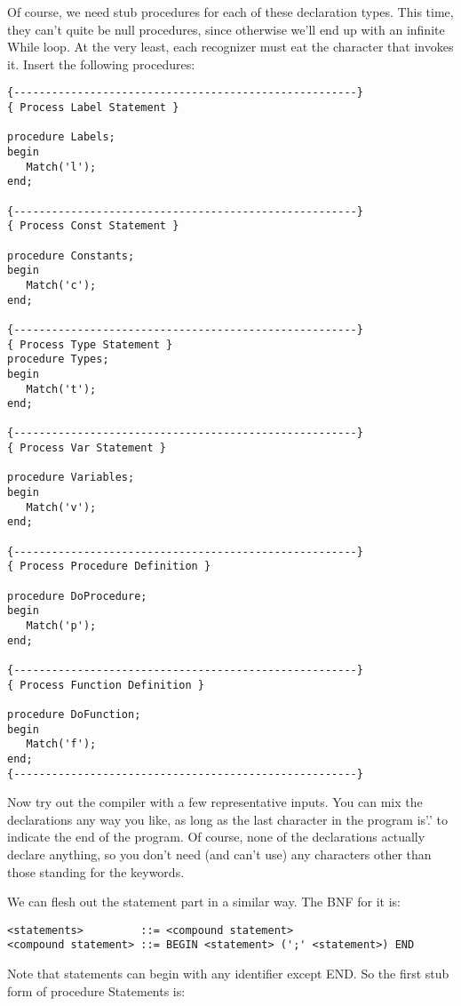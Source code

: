 Of course, we need stub  procedures for each of these declaration types. This time, they  can't  quite  be null procedures, since otherwise we'll end up with an infinite While loop. At  the very least, each recognizer must  eat  the  character that invokes it. Insert the following procedures:

\begin{verbatim}
{------------------------------------------------------}
{ Process Label Statement }

procedure Labels;
begin
   Match('l');
end;

{------------------------------------------------------}
{ Process Const Statement }

procedure Constants;
begin
   Match('c');
end;

{------------------------------------------------------}
{ Process Type Statement }
procedure Types;
begin
   Match('t');
end;

{------------------------------------------------------}
{ Process Var Statement }

procedure Variables;
begin
   Match('v');
end;

{------------------------------------------------------}
{ Process Procedure Definition }

procedure DoProcedure;
begin
   Match('p');
end;

{------------------------------------------------------}
{ Process Function Definition }

procedure DoFunction;
begin
   Match('f');
end;
{------------------------------------------------------}
\end{verbatim}

Now try out the  compiler  with a few representative inputs. You can  mix  the  declarations any way you like, as long as the last character  in  the  program is'.' to  indicate  the  end  of  the program. Of course, none  of  the declarations actually declare anything, so you don't need  (and can't use) any characters other than those standing for the keywords.

We can flesh out the statement  part  in  a similar way. The BNF for it is:

{\small
\begin{verbatim}
<statements>         ::= <compound statement>
<compound statement> ::= BEGIN <statement> (';' <statement>) END
\end{verbatim} }

Note that statements can  begin  with  any identifier except END. So the first stub form of procedure Statements is:

